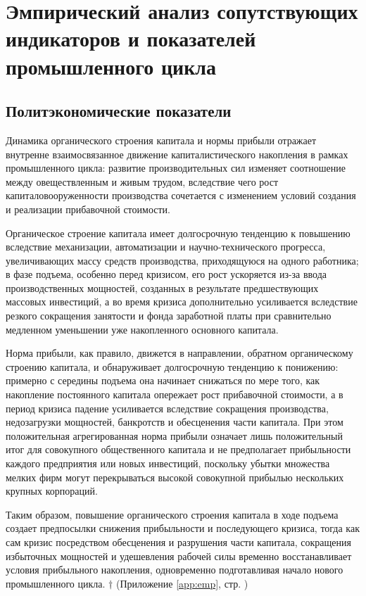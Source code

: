\section{Эмпирический анализ сопутствующих индикаторов и показателей промышленного цикла}

\subsection{Политэкономические показатели}
Динамика органического строения капитала и нормы прибыли отражает внутренне взаимосвязанное движение капиталистического накопления в рамках промышленного цикла: развитие производительных сил изменяет соотношение между овеществленным и живым трудом, вследствие чего рост капиталовооруженности производства сочетается с изменением условий создания и реализации прибавочной стоимости.

Органическое строение капитала имеет долгосрочную тенденцию к повышению вследствие механизации, автоматизации и научно-технического прогресса, увеличивающих массу средств производства, приходящуюся на одного работника; в фазе подъема, особенно перед кризисом, его рост ускоряется из-за ввода производственных мощностей, созданных в результате предшествующих массовых инвестиций, а во время кризиса дополнительно усиливается вследствие резкого сокращения занятости и фонда заработной платы при сравнительно медленном уменьшении уже накопленного основного капитала.

Норма прибыли, как правило, движется в направлении, обратном органическому строению капитала, и обнаруживает долгосрочную тенденцию к понижению: примерно с середины подъема она начинает снижаться по мере того, как накопление постоянного капитала опережает рост прибавочной стоимости, а в период кризиса падение усиливается вследствие сокращения производства, недозагрузки мощностей, банкротств и обесценения части капитала. При этом положительная агрегированная норма прибыли означает лишь положительный итог для совокупного общественного капитала и не предполагает прибыльности каждого предприятия или новых инвестиций, поскольку убытки множества мелких фирм могут перекрываться высокой совокупной прибылью нескольких крупных корпораций.

Таким образом, повышение органического строения капитала в ходе подъема создает предпосылки снижения прибыльности и последующего кризиса, тогда как сам кризис посредством обесценения и разрушения части капитала, сокращения избыточных мощностей и удешевления рабочей силы временно восстанавливает условия прибыльного накопления, одновременно подготавливая начало нового промышленного цикла. $\dagger$ (Приложение \ref{app:emp}, стр. \pageref{fig:occ-profit})

